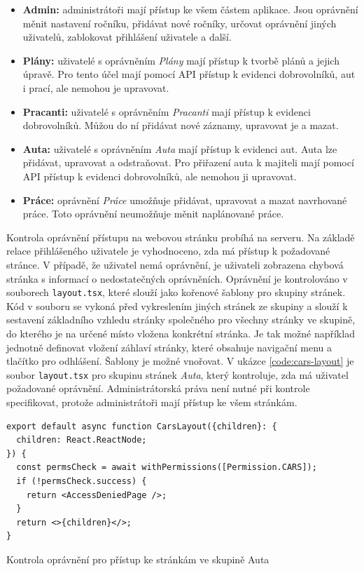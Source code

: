 \begin{itemize}
    \item \textbf{Admin:} administrátoři mají přístup ke všem částem aplikace. Jsou oprávnění měnit nastavení ročníku, přidávat nové ročníky, určovat oprávnění jiných uživatelů, zablokovat přihlášení uživatele a další.
    \item \textbf{Plány:} uživatelé s oprávněním \textit{Plány} mají přístup k tvorbě plánů a jejich úpravě. Pro tento účel mají pomocí API přístup k evidenci dobrovolníků, aut i prací, ale nemohou je upravovat.
    \item \textbf{Pracanti:} uživatelé s oprávněním \textit{Pracanti} mají přístup k evidenci dobrovolníků. Můžou do ní přidávat nové záznamy, upravovat je a mazat.
    \item \textbf{Auta:} uživatelé s oprávněním \textit{Auta} mají přístup k evidenci aut. Auta lze přidávat, upravovat a odstraňovat. Pro přiřazení auta k majiteli mají pomocí API přístup k evidenci dobrovolníků, ale nemohou ji upravovat.
    \item \textbf{Práce:} oprávnění \textit{Práce} umožňuje přidávat, upravovat a mazat navrhované práce. Toto oprávnění neumožňuje měnit naplánované práce.
\end{itemize}

Kontrola oprávnění přístupu na webovou stránku probíhá na serveru. Na základě relace přihlášeného uživatele je vyhodnoceno, zda má přístup k požadované stránce.
V případě, že uživatel nemá oprávnění, je uživateli zobrazena chybová stránka s informací o nedostatečných oprávněních.
Oprávnění je kontrolováno v souborech \texttt{layout.tsx}, které slouží jako kořenové šablony pro skupiny stránek. Kód v souboru se vykoná před vykreslením
jiných stránek ze skupiny a slouží k sestavení základního vzhledu stránky společného pro všechny stránky ve skupině, do kterého je na určené místo vložena konkrétní stránka.
Je tak možné například jednotně definovat vložení záhlaví stránky, které obsahuje navigační menu a tlačítko pro odhlášení. Šablony je možné vnořovat.
V ukázce \ref{code:cars-layout} je soubor \texttt{layout.tsx} pro skupinu stránek \textit{Auta}, který kontroluje, zda má uživatel požadované oprávnění.
Administrátorská práva není nutné při kontrole specifikovat, protože administrátoři mají přístup ke všem stránkám.

\begin{listing}[h]
  \begin{verbatim}
export default async function CarsLayout({children}: {
  children: React.ReactNode;
}) {
  const permsCheck = await withPermissions([Permission.CARS]);
  if (!permsCheck.success) {
    return <AccessDeniedPage />;
  }
  return <>{children}</>;
}
    \end{verbatim}
    \caption{Kontrola oprávnění pro přístup ke stránkám ve skupině Auta}
    \label{code:cars-layout}
\end{listing}

